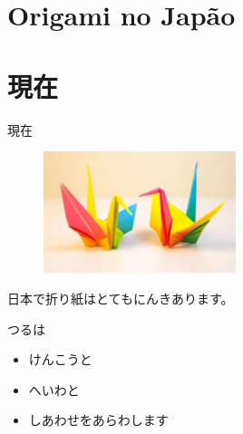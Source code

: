 \documentclass{beamer}
\begin{document}
\section{Origami no Japão}

\section{現在}
\begin{frame}{現在}
	\begin{figure}
			\includegraphics[width=0.5\textwidth]{aaa.png}
	\end{figure}
    日本で折り紙はとてもにんきあります。
    
    つるは
    \begin{itemize}
    	\item けんこうと
    	\item へいわと
    	\item しあわせをあらわします
    \end{itemize}
    
\end{frame}
\end{document}
